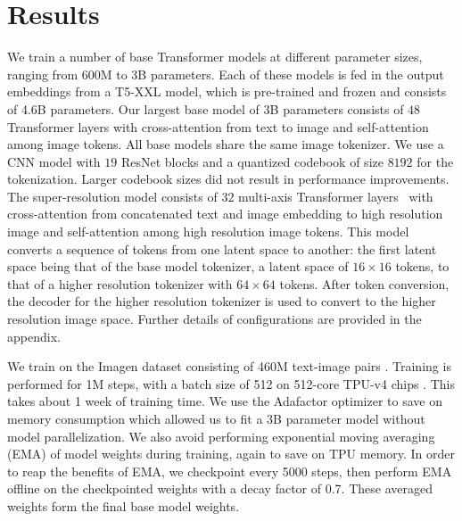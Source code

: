 \section{Results}
\label{sec:results}
We train a number of base Transformer models at different parameter sizes, ranging from 600M to 3B parameters. Each of these models is fed in the output embeddings from a T5-XXL model, which is pre-trained and frozen and consists of 4.6B parameters. Our largest base model of 3B parameters consists of $48$ Transformer layers with cross-attention from text to image and self-attention among image tokens. All base models share the same image tokenizer. We use a CNN model with $19$ ResNet blocks and a quantized codebook of size $8192$ for the tokenization. Larger codebook sizes did not result in performance improvements. %
The super-resolution model consists of $32$ multi-axis Transformer layers~\cite{hit} with cross-attention from concatenated text and image embedding to high resolution image and self-attention among high resolution image tokens. This model converts a sequence of tokens from one latent space to another: the first latent space being that of the base model tokenizer, a latent space of $16\times16$ tokens, to that of a higher resolution tokenizer with $64\times64$ tokens. After token conversion, the decoder for the higher resolution tokenizer is used to convert to the higher resolution image space. Further details of configurations are provided in the appendix.

We train on the Imagen dataset consisting of 460M text-image pairs \citep{imagen}.
Training is performed for 1M steps, with a batch size of 512 on 512-core TPU-v4 chips \citep{jouppi2020domain}. This takes about 1 week of training time. We use the Adafactor optimizer \citep{shazeer2018adafactor} to save on memory consumption which allowed us to fit a 3B parameter model without model parallelization. We also avoid performing exponential moving averaging (EMA) of model weights during training, again to save on TPU memory. In order to reap the benefits of EMA, we checkpoint every 5000 steps, then perform EMA offline on the checkpointed weights with a decay factor of 0.7. These averaged weights form the final base model weights.


